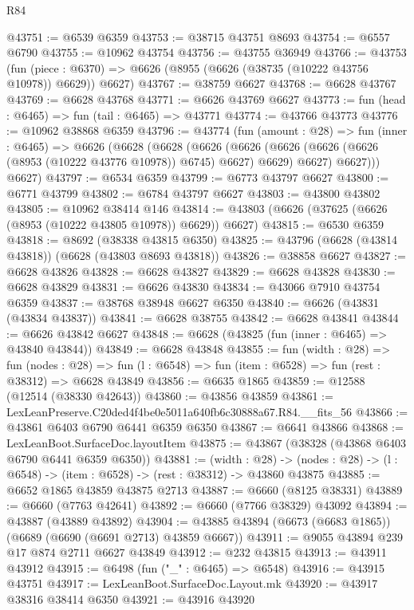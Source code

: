 \begin{lexlean}{R84}
\begin{coremodule}
@43751 := @6539 @6359
@43753 := @38715 @43751 @8693
@43754 := @6557 @6790
@43755 := @10962 @43754
@43756 := @43755 @36949
@43766 := @43753
    (fun (piece : @6370) => @6626 (@8955 (@6626 (@38735 (@10222 @43756 @10978)) @6629)) @6627)
@43767 := @38759 @6627
@43768 := @6628 @43767
@43769 := @6628 @43768
@43771 := @6626 @43769 @6627
@43773 := fun (head : @6465) => fun (tail : @6465) => @43771
@43774 := @43766 @43773
@43776 := @10962 @38868 @6359
@43796 := @43774
    (fun (amount : @28) =>
    fun (inner : @6465) =>
    @6626
      (@6628
        (@6628
          (@6626
            (@6626 (@6626 (@6626 (@6626 (@8953 (@10222 @43776 @10978)) @6745) @6627) @6629) @6627)
            @6627)))
      @6627)
@43797 := @6534 @6359
@43799 := @6773 @43797 @6627
@43800 := @6771 @43799
@43802 := @6784 @43797 @6627
@43803 := @43800 @43802
@43805 := @10962 @38414 @146
@43814 := @43803 (@6626 (@37625 (@6626 (@8953 (@10222 @43805 @10978)) @6629)) @6627)
@43815 := @6530 @6359
@43818 := @8692 (@38338 @43815 @6350)
@43825 := @43796 (@6628 (@43814 @43818)) (@6628 (@43803 @8693 @43818))
@43826 := @38858 @6627
@43827 := @6628 @43826
@43828 := @6628 @43827
@43829 := @6628 @43828
@43830 := @6628 @43829
@43831 := @6626 @43830
@43834 := @43066 @7910 @43754 @6359
@43837 := @38768 @38948 @6627 @6350
@43840 := @6626 (@43831 (@43834 @43837))
@43841 := @6628 @38755
@43842 := @6628 @43841
@43844 := @6626 @43842 @6627
@43848 := @6628 (@43825 (fun (inner : @6465) => @43840 @43844))
@43849 := @6628 @43848
@43855 := fun (width : @28) =>
  fun (nodes : @28) => fun (l : @6548) => fun (item : @6528) => fun (rest : @38312) => @6628 @43849
@43856 := @6635 @1865
@43859 := @12588 (@12514 (@38330 @42643))
@43860 := @43856 @43859
@43861 := LexLeanPreserve.C20ded4f4be0e5011a640fb6c30888a67.R84.__fits_56
@43866 := @43861 @6403 @6790 @6441 @6359 @6350
@43867 := @6641 @43866
@43868 := LexLeanBoot.SurfaceDoc.layoutItem
@43875 := @43867 (@38328 (@43868 @6403 @6790 @6441 @6359 @6350))
@43881 := (width : @28) ->
  (nodes : @28) -> (l : @6548) -> (item : @6528) -> (rest : @38312) -> @43860 @43875
@43885 := @6652 @1865 @43859 @43875 @2713
@43887 := @6660 (@8125 @38331)
@43889 := @6660 (@7763 @42641)
@43892 := @6660 (@7766 @38329) @43092
@43894 := @43887 (@43889 @43892)
@43904 := @43885 @43894 (@6673 (@6683 @1865)) (@6689 (@6690 (@6691 @2713) @43859 @6667))
@43911 := @9055 @43894 @239 @17 @874 @2711 @6627 @43849
@43912 := @232 @43815
@43913 := @43911 @43912
@43915 := @6498 (fun ("_" : @6465) => @6548)
@43916 := @43915 @43751
@43917 := LexLeanBoot.SurfaceDoc.Layout.mk
@43920 := @43917 @38316 @38414 @6350
@43921 := @43916 @43920

\end{coremodule}
\end{lexlean}
